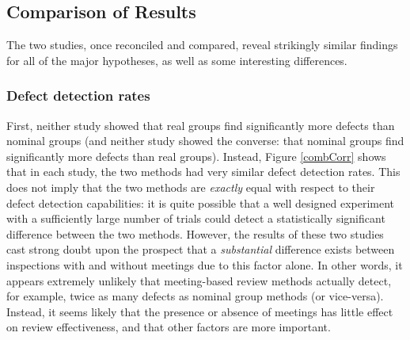 

\subsection{Comparison of Results}

The two studies, once reconciled and compared, reveal strikingly similar
findings for all of the major hypotheses, as well as some interesting
differences.

\subsubsection{Defect detection rates}

First, neither study showed that real groups find significantly more
defects than nominal groups (and neither study showed the converse: that
nominal groups find significantly more defects than real groups).  Instead,
Figure \ref{combCorr} shows that in each study, the two methods had very
similar defect detection rates.  This does not imply that the two methods
are {\em exactly} equal with respect to their defect detection
capabilities: it is quite possible that a well designed experiment with a
sufficiently large number of trials could detect a statistically
significant difference between the two methods. However, the results of
these two studies  cast strong doubt upon the prospect that a {\em substantial}
difference exists between inspections with and without meetings due to this factor
alone.  In other words, it appears extremely unlikely
that meeting-based review methods actually detect, for example, twice as many 
defects as nominal group methods (or vice-versa).  Instead, it seems likely that 
the presence or absence of meetings has little effect on review effectiveness,
and that other factors are more important. 

